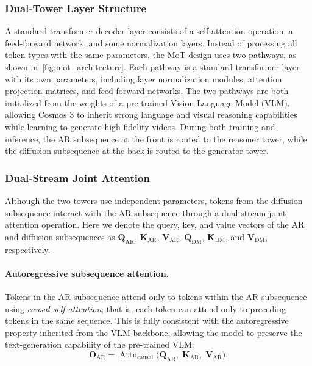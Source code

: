 

\subsubsection{Dual-Tower Layer Structure}
\label{sec:cosmos3_mot}

A standard transformer decoder layer consists of a self-attention operation, a feed-forward network, and some normalization layers. Instead of processing all token types with the same parameters, the MoT design uses two pathways, as shown in~\cref{fig:mot_architecture}. Each pathway is a standard transformer layer with its own parameters, including layer normalization modules, attention projection matrices, and feed-forward networks. The two pathways are both initialized from the weights of a pre-trained Vision-Language Model (VLM), allowing Cosmos 3 to inherit strong language and visual reasoning capabilities while learning to generate high-fidelity videos. During both training and inference, the AR subsequence at the front is routed to the reasoner tower, while the diffusion subsequence at the back is routed to the generator tower.

\subsubsection{Dual-Stream Joint Attention}
Although the two towers use independent parameters, tokens from the diffusion subsequence interact with the AR subsequence through a dual-stream joint attention operation. Here we denote the query, key, and value vectors of the AR and diffusion subsequences as $\mathbf{Q}_\text{AR}$, $\mathbf{K}_\text{AR}$, $\mathbf{V}_\text{AR}$, $\mathbf{Q}_\text{DM}$, $\mathbf{K}_\text{DM}$, and $\mathbf{V}_\text{DM}$, respectively.

\paragraph{Autoregressive subsequence attention.}
Tokens in the AR subsequence attend only to tokens within the AR subsequence using \emph{causal self-attention}; that is, each token can attend only to preceding tokens in the same sequence. This is fully consistent with the autoregressive property inherited from the VLM backbone, allowing the model to preserve the text-generation capability of the pre-trained VLM:
\begin{equation}
    \mathbf{O}_\text{AR} = \operatorname{Attn}_\text{causal}\!\bigl(
        \mathbf{Q}_\text{AR},\; \mathbf{K}_\text{AR},\; \mathbf{V}_\text{AR}
    \bigr).
    \label{eq::ar_attn}
\end{equation}


